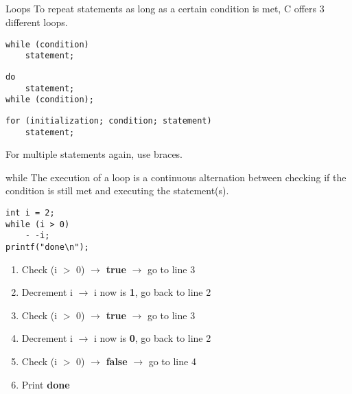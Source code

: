 \subsection{}
\begin{frame}[fragile]{Loops}
	To repeat statements as long as a certain condition is met, C offers 3 different loops.
	\begin{lstlisting}[numbers=none,basicstyle=\itshape\footnotesize]
while (condition)
	statement;
\end{lstlisting}
	\begin{lstlisting}[numbers=none,basicstyle=\itshape\footnotesize]
do
	statement;
while (condition);
\end{lstlisting}
	\begin{lstlisting}[numbers=none,basicstyle=\itshape\footnotesize]
for (initialization; condition; statement)
	statement;
\end{lstlisting}
	For multiple statements again, use braces.
\end{frame}
\begin{frame}[fragile]{while}
	The execution of a loop is a continuous alternation between checking if the condition is still met and executing the statement(s).
	\begin{lstlisting}
int i = 2;
while (i > 0)
	- -i;
printf("done\n");
\end{lstlisting}
	\begin{enumerate}[<+(1)->]
		\item Check (i $>$ 0) $\rightarrow$ \textbf{true} $\rightarrow$ go to line 3
		\item Decrement i $\rightarrow$ i now is \textbf{1}, go back to line 2
		\item Check (i $>$ 0) $\rightarrow$ \textbf{true} $\rightarrow$ go to line 3
		\item Decrement i $\rightarrow$ i now is \textbf{0}, go back to line 2
		\item Check (i $>$ 0) $\rightarrow$ \textbf{false} $\rightarrow$ go to line 4
		\item Print \textbf{done}
	\end{enumerate}
\end{frame}

